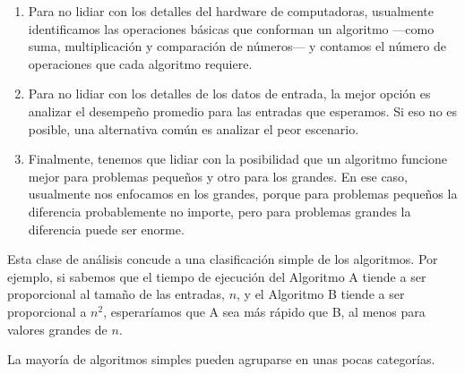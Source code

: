 \documentclass[12pt]{book}
\theoremstyle{exercise}
\begin{document}
\begin{enumerate}

\item Para no lidiar con los detalles del hardware de computadoras, 
  usualmente identificamos las operaciones básicas que conforman un
  algoritmo ---como suma, multiplicación y comparación de números--- y
  contamos el número de operaciones que cada algoritmo requiere.

\item Para no lidiar con los detalles de los datos de entrada, la mejor
  opción es analizar el desempeño promedio para las entradas que
  esperamos. Si eso no es posible, una alternativa común es analizar
  el peor escenario.

\item Finalmente, tenemos que lidiar con la posibilidad que un algoritmo
  funcione mejor para problemas pequeños y otro para los grandes. En ese
  caso, usualmente nos enfocamos en los grandes, porque para problemas
  pequeños la diferencia probablemente no importe, pero para problemas
  grandes la diferencia puede ser enorme.

\end{enumerate}

Esta clase de análisis concude a una clasificación simple de los
algoritmos. Por ejemplo, si sabemos que el tiempo de ejecución del Algoritmo
A tiende a ser proporcional al tamaño de las entradas, $n$, y el Algoritmo
B tiende a ser proporcional a $n^2$, esperaríamos que A sea más rápido que B,
al menos para valores grandes de $n$.


La mayoría de algoritmos simples pueden agruparse en unas pocas categorías.
\end{document}

